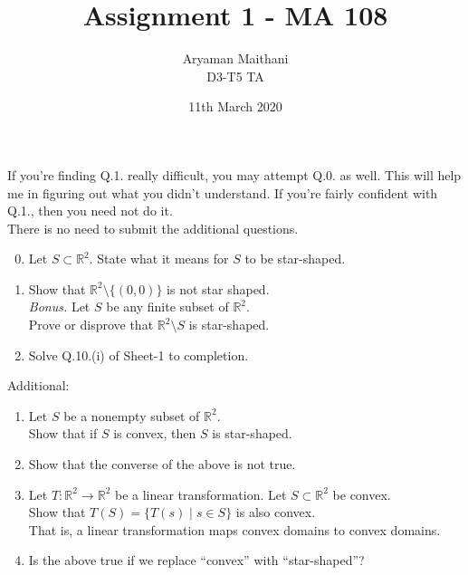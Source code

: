 \documentclass[a5paper, landscape]{article}
\title{Assignment 1 - MA 108}				%
\author{Aryaman Maithani
\\\small D3-T5 TA}
\date{11th March 2020}		%
\begin{document}
\maketitle

\hrulefill

If you're finding Q.1. really difficult, you may attempt Q.0. as well. This will help me in figuring out what you didn't understand. If you're fairly confident with Q.1., then you need not do it.\\
There is no need to submit the additional questions.

\hrulefill

\begin{enumerate}[label = Q.\arabic*.] 
	\setcounter{enumi}{-1}
	\item Let $S \subset \mathbb{R}^2.$ State what it means for $S$ to be star-shaped.
	\item Show that $\mathbb{R}^2\setminus\{(0, 0)\}$ is not star shaped.\\
	\emph{Bonus.} Let $S$ be any finite subset of $\mathbb{R}^2.$ \\
	Prove or disprove that $\mathbb{R}^2\setminus S$ is star-shaped.
	\item Solve Q.10.(i) of Sheet-1 to completion.
\end{enumerate}
Additional:
\begin{enumerate}[nosep] 
	\item Let $S$ be a nonempty subset of $\mathbb{R}^2.$\\
	Show that if $S$ is convex, then $S$ is star-shaped.
	\item Show that the converse of the above is not true.
	\item Let $T:\mathbb{R}^2\to\mathbb{R}^2$ be a linear transformation. Let $S \subset \mathbb{R}^2$ be convex. \\
	Show that $T(S) = \{T(s) \mid s \in S\}$ is also convex.\\
	That is, a linear transformation maps convex domains to convex domains.
	\item Is the above true if we replace ``convex'' with ``star-shaped''?
\end{enumerate}
\end{document}
